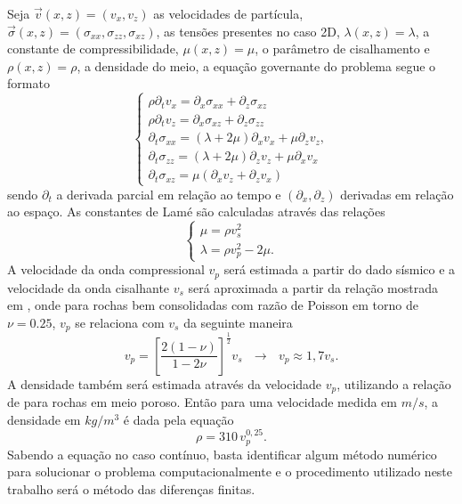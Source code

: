 \documentclass[
	12pt,				%
	openright,			%
	oneside,			%
	a4paper,			%
	english,			%
	brazil				%
	]{abntex2}
\begin{document}
	Seja $\vec{v}(x,z) = (v_x,v_z)$ as velocidades de partícula, $\vec{\sigma}(x,z) = (\sigma_{xx},\sigma_{zz},\sigma_{xz})$, as tensões presentes no caso 2D, $\lambda(x,z) = \lambda$, a constante de compressibilidade, $\mu(x,z) = \mu$, o parâmetro de cisalhamento e $\rho(x,z) = \rho$, a densidade do meio, a equação governante do problema segue o formato 
%
	\begin{equation}
		\begin{cases}
			\rho\partial_t v_x = \partial_x \sigma_{xx} + \partial_z \sigma_{xz} \\
			\rho\partial_t v_z = \partial_x \sigma_{xz} + \partial_z \sigma_{zz} \\
			\partial_t \sigma_{xx} = (\lambda + 2\mu) \partial_x v_x + \mu\partial_zv_z, \\
			\partial_t \sigma_{zz} = (\lambda + 2\mu) \partial_z v_z + \mu\partial_xv_x \\
			\partial_t \sigma_{xz} = \mu(\partial_xv_z + \partial_zv_x)
		\end{cases}
		\label{elasticWave}
	\end{equation}
%
	\noindent sendo $\partial_t$ a derivada parcial em relação ao tempo e $(\partial_x,\partial_z)$ derivadas em relação ao espaço. As constantes de Lamé são calculadas através das relações
%
	\begin{equation}
		\begin{cases}
			\mu = \rho v_s^2 \\
			\lambda = \rho v_p^2 - 2\mu.
		\end{cases}
	\end{equation}
%
	A velocidade da onda compressional $v_p$ será estimada a partir do dado sísmico e a velocidade da onda cisalhante $v_s$ será aproximada a partir da relação mostrada em , onde para rochas bem consolidadas com razão de Poisson em torno de $\nu = 0.25$, $v_p$ se relaciona com $v_s$ da seguinte maneira
%
	\begin{equation}
		v_p = \left[\dfrac{2(1-\nu)}{1 - 2\nu}\right]^{\frac{1}{2}}v_s \,\,\,\,\rightarrow\,\,\,\, v_p \approx 1,7 v_s. 
	\end{equation}  
%
	A densidade também será estimada através da velocidade $v_p$, utilizando a relação de  para rochas em meio poroso. Então para uma velocidade medida em $m/s$, a densidade em $kg/m^3$ é dada pela equação
%
	\begin{equation}
		\rho = 310 \,v_p^{0,25}.	
	\end{equation}
%
	Sabendo a equação no caso contínuo, basta identificar algum método numérico para solucionar o problema computacionalmente e o procedimento utilizado neste trabalho será o método das diferenças finitas.
\end{document}

